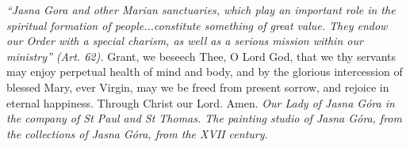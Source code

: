 \pagestyle{empty}
\hspace{0pt}
\vfill

\textit{``Jasna Gora and other Marian sanctuaries, which play an
important role in the spiritual formation of people...constitute
something of great value. They endow our Order with a special
charism, as well as a serious mission within our ministry'' (Art.
62).}
\medbreak
Grant, we beseech Thee, O Lord God, that we thy servants may enjoy perpetual health of mind and body, and by the glorious intercession of blessed Mary, ever Virgin, may we be freed from present sorrow, and rejoice in eternal happiness. Through Christ our Lord. Amen.
\vfill
\textit{Our Lady of Jasna Góra in the company of St Paul and St Thomas. The painting studio of Jasna Góra, from the collections of Jasna Góra, from the XVII century.}
\hspace{0pt}
\newpage
